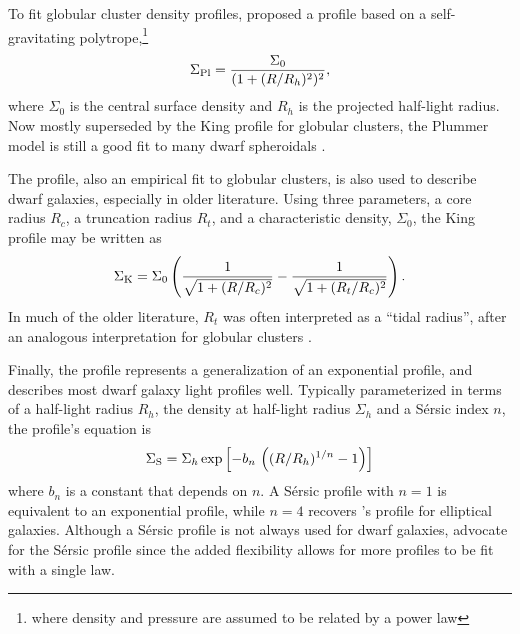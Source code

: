 To fit globular cluster density profiles, \citet{plummer1911} proposed a
profile based on a self-gravitating polytrope,\footnote{where density
  and pressure are assumed to be related by a power law}
\begin{equation}{
\Sigma_{\rm Pl} = \frac{\Sigma_0}{(1 + (R/R_h)^2)^2},
}\end{equation} where \(\Sigma_0\) is the central surface density and
\(R_h\) is the projected half-light radius. Now mostly superseded by the
King profile for globular clusters, the Plummer model is still a good
fit to many dwarf spheroidals \citep[e.g.,][]{moskowitz+walker2020}.

The \citet{king1962} profile, also an empirical fit to globular
clusters, is also used to describe dwarf galaxies, especially in older
literature. Using three parameters, a core radius \(R_c\), a truncation
radius \(R_t\), and a characteristic density, \(\Sigma_0\), the King
profile may be written as \begin{equation}{
\Sigma_{\rm K} = \Sigma_0\left(\frac{1}{\sqrt{1 + (R/R_c)^2}} - \frac{1}{\sqrt{1+(R_t/R_c)^2}}\right).
}\end{equation} In much of the older literature, \(R_t\) was often
interpreted as a ``tidal radius'', after an analogous interpretation for
globular clusters \citep[e.g.,][]{IH1995, hodge1961}.

Finally, the \citet{sersic1963} profile represents a generalization of
an exponential profile, and describes most dwarf galaxy light profiles
well. Typically parameterized in terms of a half-light radius \(R_h\),
the density at half-light radius \(\Sigma_h\) and a Sérsic index \(n\),
the profile's equation is \begin{equation}{
\Sigma_{\rm S} = \Sigma_h \exp\left[-b_n \,  \left((R/R_h)^{1/n} - 1\right)\right]
}\end{equation} where \(b_n\) is a constant that depends on \(n\). A
Sérsic profile with \(n=1\) is equivalent to an exponential profile,
while \(n=4\) recovers \citet{devaucouleurs1948}'s profile for
elliptical galaxies. Although a Sérsic profile is not always used for
dwarf galaxies, \citet{munoz+2018} advocate for the Sérsic profile since
the added flexibility allows for more profiles to be fit with a single
law.

